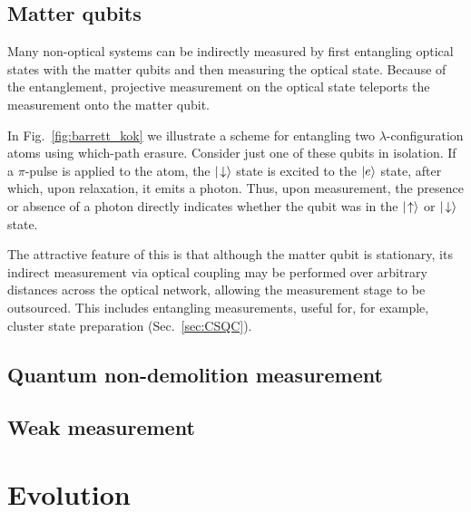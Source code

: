 
%
%

\subsection{Matter qubits} 

Many non-optical systems can be indirectly measured by first entangling optical states with the matter qubits and then measuring the optical state. Because of the entanglement, projective measurement on the optical state teleports the measurement onto the matter qubit.

In Fig.~\ref{fig:barrett_kok} we illustrate a scheme for entangling two $\lambda$-configuration atoms using which-path erasure. Consider just one of these qubits in isolation. If a $\pi$-pulse is applied to the atom, the $|\!\downarrow\rangle$ state is excited to the $|e\rangle$ state, after which, upon relaxation, it emits a photon. Thus, upon measurement, the presence or absence of a photon directly indicates whether the qubit was in the $|\!\uparrow\rangle$ or $|\!\downarrow\rangle$ state.

The attractive feature of this is that although the matter qubit is stationary, its indirect measurement via optical coupling may be performed over arbitrary distances across the optical network, allowing the measurement stage to be outsourced. This includes entangling measurements, useful for, for example, cluster state preparation (Sec.~\ref{sec:CSQC}).

%
%

\subsection{Quantum non-demolition measurement}


%
%

\subsection{Weak measurement}


%
%

\section{Evolution}

